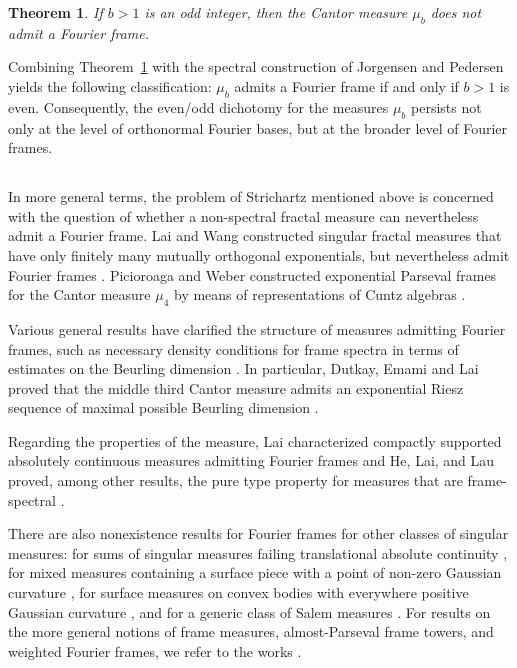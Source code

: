 \documentclass[reqno,a4paper,12pt]{amsart}
\newtheorem{theorem}[definition]{Theorem}
\begin{document}
\begin{theorem}\label{thm:no-frame}
    If $b > 1$ is an odd integer, then the Cantor measure $\mu_b$ does not admit a Fourier frame.
\end{theorem}

Combining Theorem~\ref{thm:no-frame} with the spectral construction of Jorgensen and Pedersen yields the following classification: $\mu_b$ admits a Fourier frame if and only if $b> 1$ is even. Consequently, the even/odd dichotomy for the measures $\mu_b$ persists not only at the level of orthonormal Fourier bases, but at the broader level of Fourier frames.

\subsection{}
In more general terms, the problem of Strichartz mentioned above is concerned with the question of whether a non-spectral fractal measure can nevertheless admit a Fourier frame.
Lai and Wang constructed singular fractal measures that have only finitely many mutually orthogonal exponentials, but nevertheless admit Fourier frames \cite{LaiWang17}. Picioroaga and Weber constructed exponential Parseval frames for the Cantor measure $\mu_4$ by means of representations of Cuntz algebras \cite{PicioroagaWeber17}.

Various general results have clarified the structure of measures admitting Fourier frames, such as necessary density conditions for frame spectra in terms of estimates on the  Beurling dimension  \cite{DutkayHanSunWeber11}. In particular, Dutkay, Emami and Lai proved that the middle third Cantor measure admits an exponential Riesz sequence of maximal possible Beurling dimension \cite{DutkayEmamiLai21}. 

Regarding the properties of the measure, Lai characterized compactly supported absolutely continuous measures admitting Fourier frames \cite{Lai11} and He, Lai, and Lau proved, among other results, the pure type property for measures that are frame-spectral \cite{HeLaiLau13}.

There are also nonexistence results for Fourier frames for other classes of singular measures: for sums of singular measures failing translational absolute continuity \cite{FuLai18}, for mixed measures containing a surface piece with a point of non-zero Gaussian curvature \cite{Lev18}, for surface measures on convex bodies with everywhere positive Gaussian curvature \cite{IosevichLaiLiuWyman22}, and for a generic class of Salem measures \cite{li2025fourier}.
For results on the more general notions of frame measures, almost-Parseval frame towers, and weighted Fourier frames, we refer to the works \cite{DutkayHanWeber14,DutkayLai14,LaiWang17,AnFuLai19,DutkayRanasinghe16}.
\end{document}
